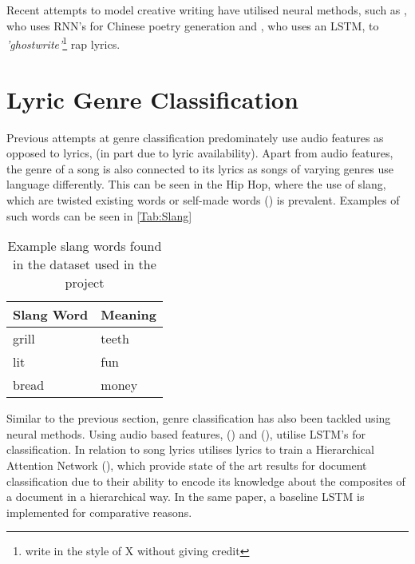 \noindent
\newline
Recent attempts to model creative writing have utilised neural methods, such as \cite{Zhang2014}, who uses RNN's for Chinese poetry generation and \cite{Potash2015}, who uses an LSTM, to \textit{'ghostwrite'}\footnote{write in the style of X without giving credit} rap lyrics. 

\section{Lyric Genre Classification}
Previous attempts at genre classification predominately use audio features as opposed to lyrics, (in part due to lyric availability). Apart from audio features, the genre of a song is also connected to its lyrics as songs of varying genres use language differently. This can be seen in the Hip Hop, where the use of slang, which are twisted existing words or self-made words (\cite{Edwards2009}) is prevalent. Examples of such words can be seen in \autoref{Tab:Slang}
\begin{table}[ht]
	\centering
	\begin{tabular}{ | p{5cm} | p{5cm} |}
		\hline
		\textbf{Slang Word} & \textbf{Meaning}\\ \hline
		grill & teeth\\ \hline
		lit & fun\\ \hline
		bread & money \\ \hline
	\end{tabular}
	\caption{Example slang words found in the dataset used in the project}
	\label{Tab:Slang}
\end{table}
\newline
Similar to the previous section, genre classification has also been tackled using neural methods. Using audio based features, (\cite{Irvin2016}) and (\cite{Pui2018}), utilise LSTM's for classification. In relation to song lyrics \cite{Tsaptsinos2017} utilises lyrics to train a Hierarchical Attention Network (\cite{Yang2016}), which provide state of the art results for document classification due to their ability to encode its knowledge about the composites of a document in a hierarchical way. In the same paper, a baseline LSTM is implemented for comparative reasons. 